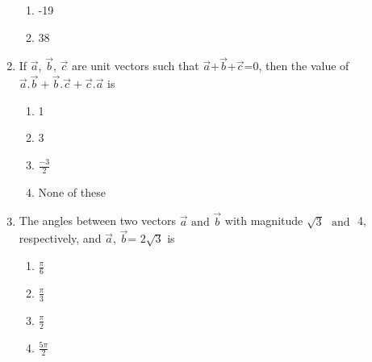 \begin{enumerate}[label=\thesubsection.\arabic*,ref=\thesubsection.\theenumi]
\begin{enumerate}
\item -19
\item 38
\end{enumerate}
\item If $\vec{a}$, $\vec{b}$, $\vec{c}$ are unit vectors such that $\vec{a}$+$\vec{b}$+$\vec{c}$=0, then the value of $\vec{a}.\vec{b}+\vec{b}.\vec{c}+\vec{c}.\vec{a}$ is
	\begin{enumerate}
\item 1
\item 3
\item $\frac{-3}{2}$
\item None of these
\end{enumerate}
\item The angles between two vectors $\vec{a}$ $\text{and}$ $\vec{b}$ with magnitude $\sqrt{3}$ $\text{ and }$ 4, respectively, and $\vec{a}$, $\vec{b}$= $2\sqrt{3}$ is
	\begin{enumerate}
\item $\frac{\pi}{6}$
\item $\frac{\pi}{3}$
\item $\frac{\pi}{2}$ 
\item $\frac{5\pi}{2}$
\end{enumerate}


\end{enumerate}
